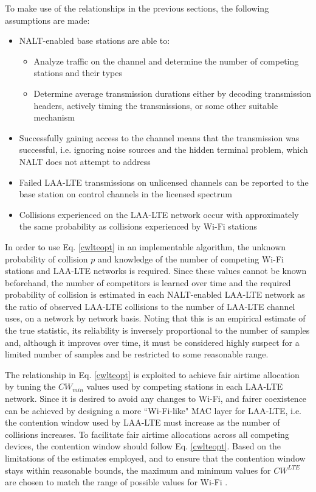 To make use of the relationships in the previous sections, the following assumptions are made:
\begin{itemize}
	\item NALT-enabled base stations are able to:
	\begin{itemize}
	\item Analyze traffic on the channel and determine the number of competing stations and their types
	\item Determine average transmission durations either by decoding transmission headers, actively timing the transmissions, or some other suitable mechanism
	\end{itemize} 
	\item Successfully gaining access to the channel means that the transmission was successful, i.e. ignoring noise sources and the hidden terminal problem, which NALT does not attempt to address
	\item Failed \mbox{LAA-LTE} transmissions on unlicensed channels can be reported to the base station on control channels in the licensed spectrum
	\item Collisions experienced on the LAA-LTE network occur with approximately the same probability as collisions experienced by Wi-Fi stations
\end{itemize}

In order to use Eq. \ref{cwlteopt} in an implementable algorithm, the unknown probability of collision  $p$ and knowledge of the number of competing Wi-Fi stations and LAA-LTE networks is required. Since these values cannot be known beforehand, the number of competitors is learned over time and the required probability of collision is estimated in each NALT-enabled LAA-LTE network as the ratio of observed \mbox{LAA-LTE} collisions to the number of \mbox{LAA-LTE} channel uses, on a network by network basis.  Noting that this is an empirical estimate of the true statistic, its reliability is inversely proportional to the number of samples and, although it improves over time, it must be considered highly suspect for a limited number of samples and be restricted to some reasonable range. 

The relationship in Eq. \ref{cwlteopt} is exploited to achieve fair airtime allocation by tuning the $CW_{min}$ values used by competing stations in each LAA-LTE network.  Since it is desired to avoid any changes to \mbox{Wi-Fi}, and fairer coexistence can be achieved by designing a more \mbox{``\mbox{Wi-Fi}-like"} MAC layer for \mbox{LAA-LTE}, i.e. the contention window used by \mbox{LAA-LTE} must increase as the number of collisions increases.  To facilitate fair airtime allocations across all competing devices, the contention window should follow Eq. \ref{cwlteopt}.  Based on the limitations of the estimates employed, and to ensure that the contention window stays within reasonable bounds, the maximum and minimum values for $CW^{LTE}$ are chosen to match the range of possible values for \mbox{Wi-Fi} \cite{80211}.  

